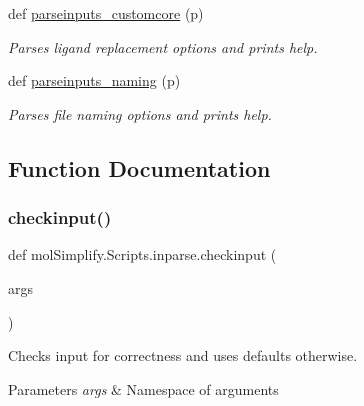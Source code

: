 \begin{DoxyCompactItemize}
def \hyperlink{namespacemolSimplify_1_1Scripts_1_1inparse_a4074ca87aa16125d8d83ddb435dffdca}{parseinputs\+\_\+customcore} (p)
\begin{DoxyCompactList}\small\item\em Parses ligand replacement options and prints help. \end{DoxyCompactList}\item 
def \hyperlink{namespacemolSimplify_1_1Scripts_1_1inparse_ac12552e07d9ca0394ea31de10ebf3e8e}{parseinputs\+\_\+naming} (p)
\begin{DoxyCompactList}\small\item\em Parses file naming options and prints help. \end{DoxyCompactList}\end{DoxyCompactItemize}


\subsection{Function Documentation}
\mbox{\label{namespacemolSimplify_1_1Scripts_1_1inparse_a203f9e024653c08748547720007d0802}} 
\subsubsection{\texorpdfstring{checkinput()}{checkinput()}}
{\footnotesize\ttfamily def mol\+Simplify.\+Scripts.\+inparse.\+checkinput (\begin{DoxyParamCaption}\item[{}]{args }\end{DoxyParamCaption})}



Checks input for correctness and uses defaults otherwise. 


\begin{DoxyParams}{Parameters}
{\em args} & Namespace of arguments \\
\hline
\end{DoxyParams}
\mbox{\label{namespacemolSimplify_1_1Scripts_1_1inparse_a31f3057a17648db55232eb494e3cece3}} 
